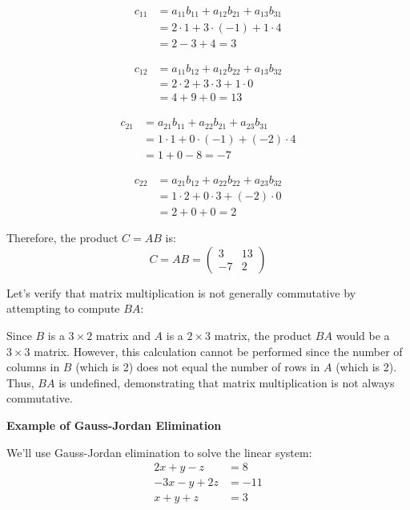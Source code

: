\begin{align*}
c_{11} &= a_{11}b_{11} + a_{12}b_{21} + a_{13}b_{31} \\
&= 2 \cdot 1 + 3 \cdot (-1) + 1 \cdot 4 \\
&= 2 - 3 + 4 = 3
\end{align*}

\begin{align*}
c_{12} &= a_{11}b_{12} + a_{12}b_{22} + a_{13}b_{32} \\
&= 2 \cdot 2 + 3 \cdot 3 + 1 \cdot 0 \\
&= 4 + 9 + 0 = 13
\end{align*}

\begin{align*}
c_{21} &= a_{21}b_{11} + a_{22}b_{21} + a_{23}b_{31} \\
&= 1 \cdot 1 + 0 \cdot (-1) + (-2) \cdot 4 \\
&= 1 + 0 - 8 = -7
\end{align*}

\begin{align*}
c_{22} &= a_{21}b_{12} + a_{22}b_{22} + a_{23}b_{32} \\
&= 1 \cdot 2 + 0 \cdot 3 + (-2) \cdot 0 \\
&= 2 + 0 + 0 = 2
\end{align*}

Therefore, the product \(C = AB\) is:
\begin{equation*}
C = AB = 
\begin{pmatrix}
3 & 13 \\
-7 & 2
\end{pmatrix}
\end{equation*}

Let's verify that matrix multiplication is not generally commutative by attempting to compute \(BA\):
\vspace{\baselineskip}

Since \(B\) is a \(3 \times 2\) matrix and \(A\) is a \(2 \times 3\) matrix, the product \(BA\) would be a \(3 \times 3\) matrix. However, this calculation cannot be performed since the number of columns in \(B\) (which is 2) does not equal the number of rows in \(A\) (which is 2). Thus, \(BA\) is undefined, demonstrating that matrix multiplication is not always commutative.
\vspace{\baselineskip}

\textbf{Example of Gauss-Jordan Elimination}
\vspace{\baselineskip}

We'll use Gauss-Jordan elimination to solve the linear system:
\begin{align*}
2x + y - z &= 8 \\
-3x - y + 2z &= -11 \\
x + y + z &= 3
\end{align*}


